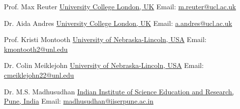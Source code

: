 

\begin{cventries}

  \vspace{2.0mm}

  \eduentry
    {Prof. Max Reuter}  %
    {\href{https://www.ucl.ac.uk/}{University College London, UK}}  %
    {Email: \href{mailto:m.reuter@ucl.ac.uk}{m.reuter@ucl.ac.uk}}
    {}  %

  \vspace{2.0mm} %

  \eduentry
    {Dr. Aida Andres} %
    {\href{https://www.ucl.ac.uk/}{University College London, UK}}  %
    {Email: \href{mailto:a.andres@ucl.ac.uk}{a.andres@ucl.ac.uk}}
    {}  %
  
  \vspace{2.0mm} %

  \eduentry
    {Prof. Kristi Montooth}  %
    {\href{https://biosci.unl.edu/}{University of Nebraska-Lincoln, USA}}  %
    {Email: \href{mailto:kmontooth2@unl.edu}{kmontooth2@unl.edu}}  %
    {}  %

  \vspace{2.0mm} %

  \eduentry
    {Dr. Colin Meiklejohn}  %
    {\href{https://biosci.unl.edu/}{University of Nebraska-Lincoln, USA}}  %
    {Email: \href{mailto:cmeiklejohn2@unl.edu}{cmeiklejohn22@unl.edu}}  %
    {}  %

  \vspace{2.0mm} %
  
  \eduentry
    {Dr. M.S. Madhusudhan}  %
	{\href{https://www.iiserpune.ac.in/}{Indian Institute of Science Education and Research, Pune, India}} %
	{Email: \href{mailto:madhusudhan@iiserpune.ac.in}{madhusudhan@iiserpune.ac.in}}  %
    {}  %


\end{cventries}